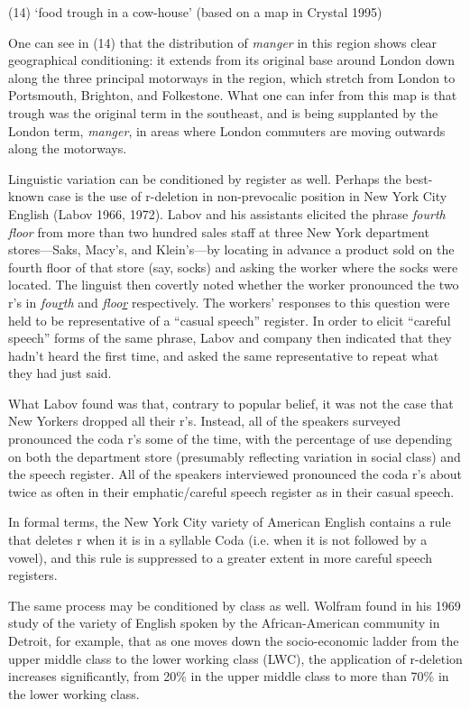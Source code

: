\begin{exe}
	(14) ‘food trough in a cow-house’ (based on a map in Crystal 1995)
\end{exe}


One can see in (14) that the distribution of \textit{manger} in this region shows clear geographical conditioning: it extends from its original base around London down along the three principal motorways in the region, which stretch from London to Portsmouth, Brighton, and Folkestone. What one can infer from this map is that trough was the original term in the southeast, and is being supplanted by the London term, \textit{manger}, in areas where London commuters are moving outwards along the motorways.

Linguistic variation can be conditioned by register as well. Perhaps the best-known case is the use of r-deletion in non-prevocalic position in New York City English (Labov 1966, 1972). Labov and his assistants elicited the phrase \textit{fourth floor} from more than two hundred sales staff at three New York department stores—Saks, Macy’s, and Klein’s—by locating in advance a product sold on the fourth floor of that store (say, socks) and asking the worker where the socks were located. The linguist then covertly noted whether the worker pronounced the two r’s in \textit{fou\underline{r}th} and \textit{floo\underline{r}} respectively. The workers’ responses to this question were held to be representative of a “casual speech” register. In order to elicit “careful speech” forms of the same phrase, Labov and company then indicated that they hadn’t heard the first time, and asked the same representative to repeat what they had just said.

What Labov found was that, contrary to popular belief, it was not the case that New Yorkers dropped all their r’s. Instead, all of the speakers surveyed pronounced the coda r’s some of the time, with the percentage of use depending on both the department store (presumably reflecting variation in social class) and the speech register. All of the speakers interviewed pronounced the coda r’s about twice as often in their emphatic/careful speech register as in their casual speech.

In formal terms, the New York City variety of American English contains a rule that deletes r when it is in a syllable Coda (i.e. when it is not followed by a vowel), and this rule is suppressed to a greater extent in more careful speech registers.

The same process may be conditioned by class as well. Wolfram found in his 1969 study of  the variety of English spoken by the African-American community in Detroit, for example, that as one moves down the socio-economic ladder from the upper middle class to the lower working class (LWC), the application of r-deletion increases significantly, from 20\% in the upper middle class to more than 70\% in the lower working class.

